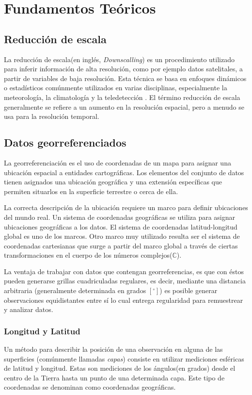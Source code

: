 \chapter{Fundamentos Teóricos}
\label{C2}
\section{Reducción de escala}
La reducción de escala(en inglés, \textit{Downscalling}) es un procedimiento utilizado para inferir 
información de alta resolución, como por ejemplo datos satelitales, a partir de variables de baja 
resolución. Esta técnica se basa en enfoques dinámicos o estadísticos comúnmente utilizados en varias 
disciplinas, especialmente la meteorología, la climatología y la teledetección . El término reducción 
de escala generalmente se refiere a un aumento en la resolución espacial, pero a menudo se usa para la 
resolución temporal.
%
%
%
%
\section{Datos georreferenciados}
La georreferenciación es el uso de coordenadas de un mapa para asignar una ubicación espacial a entidades
cartográficas. Los elementos del conjunto de datos tienen asignados una ubicación geográfica y una extensión específicas
que permiten situarlos en la superficie terrestre o cerca de ella.

La correcta descripción de la ubicación requiere un marco para definir ubicaciones del mundo real. Un sistema de coordenadas geográficas
se utiliza para asignar ubicaciones geográficas a los datos. El sistema de coordenadas latitud-longitud global es uno de los marcos.
Otro marco muy utilizado resulta ser el sistema de coordenadas cartesianas que surge a partir del marco global a través de ciertas transformaciones
en el cuerpo de los números complejos($\mathbb{C}$).

La ventaja de trabajar con datos que contengan georreferencias, es que con éstos pueden generarse grillas cuadriculadas regulares, es decir, mediante una distancia arbitraria (generalmente determinada en grados $[^{\circ}]$)
es posible generar observaciones equidistantes entre sí lo cual entrega regularidad para remuestrear y analizar datos.

    \subsection{Longitud y Latitud}
    Un método para describir la posición de una observación en alguna de las superficies (comúnmente llamadas \textit{capas}) consiste en utilizar 
    mediciones esféricas de latitud y longitud. Estas son mediciones de los ángulos(en grados) desde el centro de la Tierra hasta un punto de una determinada
    capa. Este tipo de coordenadas se denominan como coordenadas geográficas.

